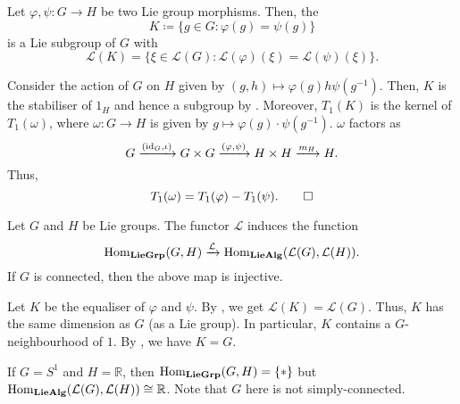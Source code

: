 \documentclass[12pt]{article}
\begin{document}
\begin{lem} \label{lem:equaliser-subgroup-tangent-space}
	Let $\varphi, \psi \colon G \to H$ be two Lie group morphisms. Then, the 
	\begin{equation*} 
		K \coloneqq \{g \in G : \varphi(g) = \psi(g)\}
	\end{equation*}
	is a Lie subgroup of $G$ with
	\begin{equation*} 
		\mathcal{L}(K) = \{\xi \in \mathcal{L}(G) : \mathcal{L}(\varphi)(\xi) = \mathcal{L}(\psi)(\xi)\}.
	\end{equation*}
\end{lem}
\begin{sketch} 
	Consider the action of $G$ on $H$ given by $(g, h) \mapsto \varphi(g) h \psi(g^{-1})$. 
	Then, $K$ is the stabiliser of $1_{H}$ and hence a subgroup by . 
	Moreover, $T_{1}(K)$ is the kernel of $T_{1}(\omega)$, where $\omega \colon G \to H$ is given by $g \mapsto \varphi(g) \cdot \psi(g^{-1})$. 
	$\omega$ factors as
	\begin{equation*} 
		G \xrightarrow{(\operatorname{id}_{G}, \iota)} G \times G \xrightarrow{(\varphi, \psi)} H \times H \xrightarrow{m_{H}} H.
	\end{equation*}
	Thus,
	\begin{equation*} 
		T_{1}(\omega) = T_{1}(\varphi) - T_{1}(\psi). \qedhere
	\end{equation*}
\end{sketch}

\begin{thm}
	Let $G$ and $H$ be Lie groups. The functor $\mathcal{L}$ induces the function
	\begin{equation*} 
		\operatorname{Hom}_{\mathbf{LieGrp}}(G, H) \xrightarrow{\mathcal{L}} \operatorname{Hom}_{\mathbf{LieAlg}}(\mathcal{L}(G), \mathcal{L}(H)).
	\end{equation*}
	If $G$ is connected, then the above map is injective.
\end{thm}
\begin{sketch} 
	Let $K$ be the equaliser of $\varphi$ and $\psi$. 
	By , we get $\mathcal{L}(K) = \mathcal{L}(G)$. 
	Thus, $K$ has the same dimension as $G$ (as a Lie group). 
	In particular, $K$ contains a $G$-neighbourhood of $1$. 
	By , we have $K = G$.
\end{sketch}

\begin{ex}
	If $G = S^{1}$ and $H = \mathbb{R}$, then $\operatorname{Hom}_{\mathbf{LieGrp}}(G, H) = \{\ast\}$ but $\operatorname{Hom}_{\mathbf{LieAlg}}(\mathcal{L}(G), \mathcal{L}(H)) \cong \mathbb{R}$. 
	Note that $G$ here is not simply-connected.
\end{ex}
\end{document}
